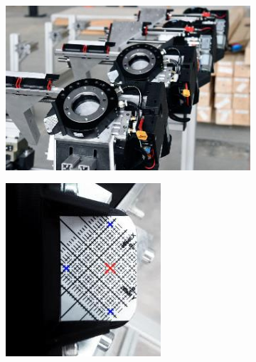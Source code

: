 \documentclass[11pt]{book}
\begin{document}
\begin{figure}[H]
\centering
\begin{subfigure}[b]{0.45\textwidth}
\centering
\includegraphics[width=\textwidth]{./images/image76.jpeg}
\end{subfigure}
\hfill
\begin{subfigure}[b]{0.45\textwidth}
\centering
\includegraphics[width=\textwidth]{./images/image77.jpeg}
\end{subfigure}
\end{figure}
\end{document}
